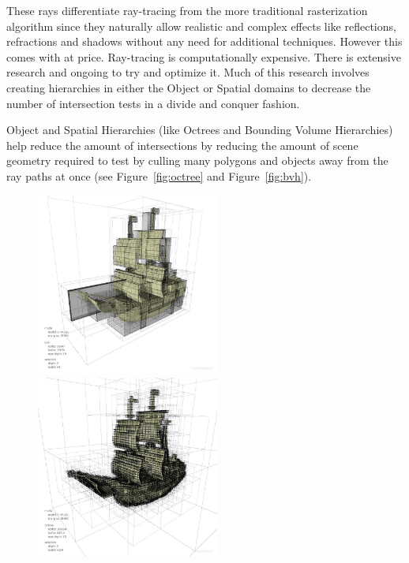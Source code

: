 These rays differentiate ray-tracing from the more traditional rasterization algorithm since they naturally allow realistic and complex effects like reflections, refractions and shadows without any need for additional techniques. However this comes with at price. Ray-tracing is computationally expensive. There is extensive research and ongoing to try and optimize it. Much of this research involves creating hierarchies in either the Object or Spatial domains to decrease the number of intersection tests in a divide and conquer fashion.

\medskip

Object and Spatial Hierarchies (like Octrees and Bounding Volume Hierarchies) help reduce the amount of intersections by reducing the amount of scene geometry required to test by culling many polygons and objects away from the ray paths at once (see Figure~\ref{fig:octree} and Figure~\ref{fig:bvh}).

\begin{figure}[!htb]
    \begin{minipage}{0.475\linewidth}
        \centering
        \includegraphics[width=6.0cm]{Images/BVH_Render}
    \end{minipage}
    \begin{minipage}{0.475\linewidth}
        \centering
        \includegraphics[width=6.0cm]{Images/Octree_Render}
    \end{minipage}
\end{figure}


